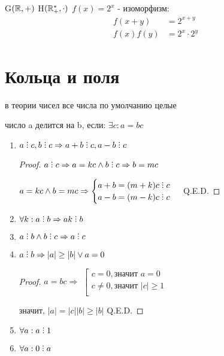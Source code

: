 \begin{eg}
    G$(\mathbb{R}, +)$
    H$(\mathbb{R}^{*}_{+}, \cdot)$
    $f(x) = 2^x$ - изоморфизм: 
    \begin{align*}
        f(x+y) &= 2^{x+y} \\
        f(x)f(y) &= 2^x \cdot 2^y
    \end{align*}
\end{eg}


\section{Кольца и поля}


\begin{remark}
    в теории чисел все числа по умолчанию целые
\end{remark}

\begin{definition}
    число a делится на b, если:
    $\exists c: a= bc$
\end{definition}

\begin{property}
    \begin{enumerate}
        \item $a \divby c, b \divby c \Rightarrow a + b \divby c, a - b \divby c$
        \begin{proof}
            $ a \divby c \Rightarrow a = kc \land b \divby c \Rightarrow b = mc$
            
            $a = kc \land b = mc \Rightarrow \begin{cases}
                a + b = (m + k)c \divby c \\
                a - b = (m - k)c \divby c
                \end{cases}$ Q.E.D.
        \end{proof}
        \item $ \forall k: a \divby b \Rightarrow ak \divby b$
        \item $a \divby b \land b \divby c \Rightarrow a \divby c$
        \item $a \divby b \Rightarrow |a| \geq |b| \lor a = 0$
        \begin{proof}
            $a = bc \Rightarrow$
            $\left[ 
                \begin{gathered} 
                c = 0, \text{значит } a = 0\\ 
                c \neq 0, \text{значит } |c| \geq 1\\ 
                \end{gathered} 
            \right.$
            
            $\text{значит, } |a| = |c||b| \geq |b|$ Q.E.D.
        \end{proof}
        \item $\forall a: a \divby 1$
        \item $\forall a: 0 \divby a$
    \end{enumerate}
\end{property}

